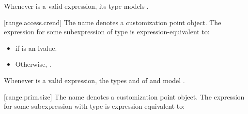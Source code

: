 \pnum
\begin{note}
Whenever  is a valid expression, its
type models .
\end{note}

[range.access.crend]{}
\pnum
The name  denotes a customization point
object. The expression
 for some subexpression  of type 
is expression-equivalent to:
\begin{itemize}
\item {} if  is an lvalue.

\item Otherwise, .
\end{itemize}

\pnum
\begin{note}
Whenever  is a valid expression,
the types  and  of
 and 
model .
\end{note}

[range.prim.size]{}
\pnum
The name  denotes a customization point
object. The expression
 for some subexpression  with type
 is expression-equivalent to:

